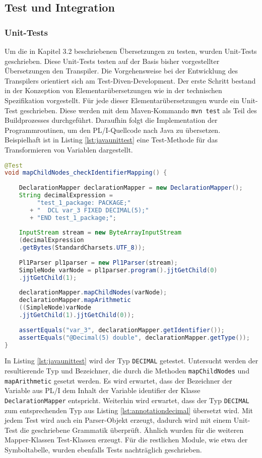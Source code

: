 \pagebreak
\subsection{Test und Integration}
\subsubsection{Unit-Tests}

Um die in Kapitel 3.2 beschriebenen Übersetzungen zu testen, wurden Unit-Tests geschrieben. 
Diese Unit-Tests testen auf der Basis bisher vorgestellter Übersetzungen den Transpiler. Die Vorgehensweise bei der Entwicklung des Transpilers orientiert sich am Test-Diven-Development. 
Der erste Schritt bestand in der Konzeption von Elementarübersetzungen wie in der technischen Spezifikation vorgestellt.
Für jede dieser Elementarübersetzungen wurde ein Unit-Test geschrieben. Diese werden mit dem Maven-Kommando \verb+mvn test+ als Teil des Buildprozesses durchgeführt. Daraufhin folgt die Implementation der Programmroutinen, um den PL/I-Quellcode nach Java zu übersetzen.
Beispielhaft ist in Listing \ref{lst:javaunittest} eine Test-Methode für das Transformieren von Variablen dargestellt.

\begin{lstlisting}[language=Java, caption=Positvtest für die Übersetzung eines arithmetischen Ausdrucks, label={lst:javaunittest}]
@Test
void mapChildNodes_checkIdentifierMapping() {
	
	DeclarationMapper declarationMapper = new DeclarationMapper();
	String decimalExpression = 
		 "test_1_package: PACKAGE;" 
	   + "	DCL var_3 FIXED DECIMAL(5);" 
	   + "END test_1_package;";
	
	InputStream stream = new ByteArrayInputStream
	(decimalExpression
	.getBytes(StandardCharsets.UTF_8));
	
	Pl1Parser pl1parser = new Pl1Parser(stream);
	SimpleNode varNode = pl1parser.program().jjtGetChild(0)
	.jjtGetChild(1);
		
	declarationMapper.mapChildNodes(varNode);
	declarationMapper.mapArithmetic
	((SimpleNode)varNode
	.jjtGetChild(1).jjtGetChild(0));
		
	assertEquals("var_3", declarationMapper.getIdentifier());
	assertEquals("@Decimal(5) double", declarationMapper.getType());
}
\end{lstlisting} 

In Listing \ref{lst:javaunittest}  wird der Typ \verb+DECIMAL+ getestet. Untersucht werden der resultierende Typ und Bezeichner, die durch die Methoden \verb+mapChildNodes+ und \verb+mapArithmetic+ gesetzt werden. Es wird erwartet, dass der Bezeichner der Variable aus PL/I dem Inhalt der Variable identifier der Klasse \verb+DeclarationMapper+ entspricht.
Weiterhin wird erwartet, dass der Typ \verb+DECIMAL+ zum entsprechenden Typ aus Listing \ref{lst:annotationdecimal} übersetzt wird.
Mit jedem Test wird auch ein Parser-Objekt erzeugt, dadurch wird  mit einem Unit-Test die geschriebene Grammatik überprüft.
Ähnlich wurden  für die weiteren Mapper-Klassen Test-Klassen erzeugt.
Für die restlichen Module, wie etwa der Symboltabelle, wurden ebenfalls Tests nachträglich geschrieben.

